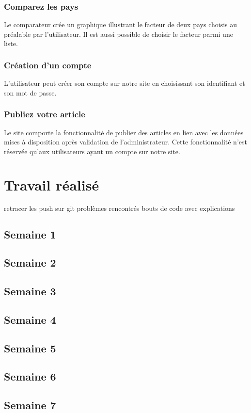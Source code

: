 \documentclass[12pt,a4paper]{report}
\begin{document}
\subsection{Comparez les pays}
	Le comparateur crée un graphique illustrant le facteur de deux pays choisis au préalable par l'utilisateur. Il est aussi possible de choisir le facteur parmi une liste. 
\subsection{Création d'un compte}
	L'utilisateur peut créer son compte sur notre site en choisissant son identifiant et son mot de passe. 
\subsection{Publiez votre article}
	Le site comporte la fonctionnalité de publier des articles en lien avec les données mises à disposition après validation de l'administrateur. Cette fonctionnalité n'est réservée qu'aux utilisateurs ayant un compte sur notre site.

\chapter{Travail réalisé}
retracer les push sur git 
problèmes rencontrés
bouts de code avec explications 
\section{Semaine 1}
\section{Semaine 2}
\section{Semaine 3}
\section{Semaine 4}
\section{Semaine 5}
\section{Semaine 6}
\section{Semaine 7}
\end{document}
